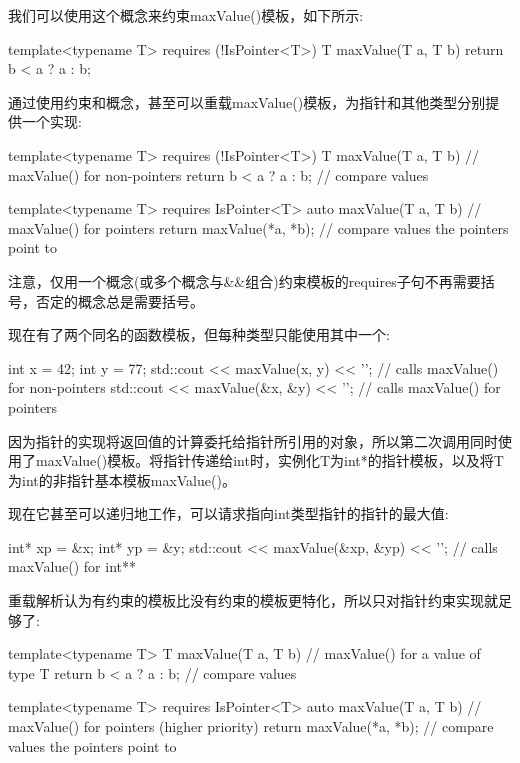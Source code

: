 我们可以使用这个概念来约束maxValue()模板，如下所示:

\begin{cpp}
template<typename T>
requires (!IsPointer<T>)
T maxValue(T a, T b)
{
	return b < a ? a : b;
}
\end{cpp}


通过使用约束和概念，甚至可以重载maxValue()模板，为指针和其他类型分别提供一个实现:

\begin{cpp}
template<typename T>
requires (!IsPointer<T>)
T maxValue(T a, T b) // maxValue() for non-pointers
{
	return b < a ? a : b; // compare values
}

template<typename T>
requires IsPointer<T>
auto maxValue(T a, T b) // maxValue() for pointers
{
	return maxValue(*a, *b); // compare values the pointers point to
}
\end{cpp}

注意，仅用一个概念(或多个概念与\&\&组合)约束模板的requires子句不再需要括号，否定的概念总是需要括号。

现在有了两个同名的函数模板，但每种类型只能使用其中一个:

\begin{cpp}
int x = 42;
int y = 77;
std::cout << maxValue(x, y) << '\n'; // calls maxValue() for non-pointers
std::cout << maxValue(&x, &y) << '\n'; // calls maxValue() for pointers
\end{cpp}

因为指针的实现将返回值的计算委托给指针所引用的对象，所以第二次调用同时使用了maxValue()模板。将指针传递给int时，实例化T为int*的指针模板，以及将T为int的非指针基本模板maxValue()。

现在它甚至可以递归地工作，可以请求指向int类型指针的指针的最大值:

\begin{cpp}
int* xp = &x;
int* yp = &y;
std::cout << maxValue(&xp, &yp) << '\n'; // calls maxValue() for int**
\end{cpp}


重载解析认为有约束的模板比没有约束的模板更特化，所以只对指针约束实现就足够了:

\begin{cpp}
template<typename T>
T maxValue(T a, T b) // maxValue() for a value of type T
{
	return b < a ? a : b; // compare values
}

template<typename T>
requires IsPointer<T>
auto maxValue(T a, T b) // maxValue() for pointers (higher priority)
{
	return maxValue(*a, *b); // compare values the pointers point to
}
\end{cpp}

